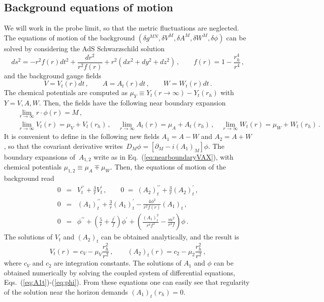 \documentclass[epj]{webofc}
\begin{document}
\subsection{Background equations of motion}
\label{sec:bkg}

 We will work in the probe limit, so that the metric fluctuations are neglected. The equations of motion of the background $(\delta g^{MN}, \delta V^M, \delta A^M, \delta W^M, \delta \phi)$ can be solved by considering the AdS Schwarzschild solution
\begin{equation}
ds^2 = -r^2f(r) dt^2 + \frac{dr^2}{r^2f(r)} + r^2\left( dx^2 + dy^2 + dz^2\right) \,, \qquad f(r) = 1 - \frac{r_h^4}{r^4} \,,
\end{equation}
and the background gauge fields
\begin{equation}
V = V_t(r)dt \,, \qquad A = A_t(r)dt \,, \qquad W = W_t(r)dt  \,. 
\end{equation}
The chemical potentials are computed as $\mu_Y \equiv Y_t(r\to\infty) - Y_t(r_h)$ with $Y = V, A, W$. Then, the fields have the following near boundary expansion
\begin{eqnarray}
&&\lim_{r\to\infty} r \cdot \phi(r) = M \,, \label{eq:nearboundaryphi}  \\
&&\lim_{r\to\infty} V_t(r) = \mu_V + V_t(r_h) \,, \quad \lim_{r\to\infty} A_t(r) = \mu_A + A_t(r_h) \,, \quad \lim_{r\to\infty} W_t(r) = \mu_W + W_t(r_h) \,. \label{eq:nearboundaryVAX}
\end{eqnarray}
It is convenient to define in the following new fields $A_1 = A - W$ and $A_2 = A + W$, so that the covariant derivative writes~$D_M\phi = \left[ \partial_M -i(A_1)_M \right] \phi$. The boundary expansions of~$A_{1,2}$ write as in Eq.~(\ref{eq:nearboundaryVAX}), with chemical potentials $\mu_{1,2} \equiv \mu_A  \mp \mu_W$. Then, the equations of motion of the background read
\begin{eqnarray}
0 &=& V_t^{\prime\prime} + \frac{3}{r} V_t^\prime \,, \qquad 0 \; =  \; (A_2)_t^{\prime\prime} + \frac{3}{r} (A_2)_t^\prime \,, \label{eq:Vt} \\
0 &=& (A_1)_t^{\prime\prime} + \frac{3}{r} (A_1)_t^\prime - \frac{4 \phi^2}{r^2f(r)}(A_1)_t \,, \label{eq:A1t}  \\ 
0 &=& \phi^{\prime\prime} + \left( \frac{5}{r} + \frac{f^\prime}{f} \right) \phi^\prime + \left( \frac{(A_1)_t^2}{r^4f^2} - \frac{m^2}{r^2f} \right) \phi \,. \label{eq:phi} 
\end{eqnarray}
The solutions of $V_t$ and $(A_2)_t$ can be obtained analytically, and the result is\begin{equation}
V_t(r) = c_V - \mu_V \frac{r_h^2}{r^2} \,, \qquad (A_2)_t(r) = c_2 - \mu_2 \frac{r_h^2}{r^2} \,,
\end{equation}
where $c_V$ and $c_2$ are integration constants. The solutions of $A_1$ and $\phi$ can be obtained numerically by solving the coupled system of differential equations, Eqs.~(\ref{eq:A1t})-(\ref{eq:phi}). From these equations one can easily see that regularity of the solution near the horizon demands $(A_1)_t(r_h) = 0$.
\end{document}
